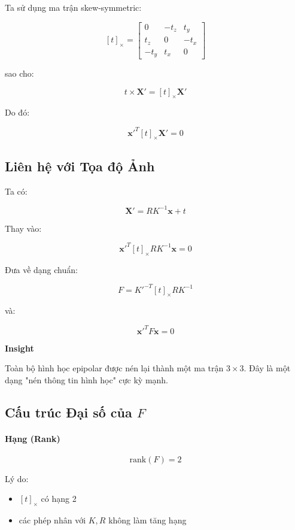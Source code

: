 Ta sử dụng ma trận skew-symmetric:

\[
[t]_\times =
\begin{bmatrix}
	0 & -t_z & t_y \\
	t_z & 0 & -t_x \\
	-t_y & t_x & 0
\end{bmatrix}
\]

sao cho:

\[
t \times \mathbf{X}' = [t]_\times \mathbf{X}'
\]

Do đó:

\[
\mathbf{x}'^T [t]_\times \mathbf{X}' = 0
\]

\subsection{Liên hệ với Tọa độ Ảnh}
\label{subsec:image_relation}

Ta có:

\[
\mathbf{X}' = R K^{-1} \mathbf{x} + t
\]

Thay vào:

\[
\mathbf{x}'^T [t]_\times R K^{-1} \mathbf{x} = 0
\]

Đưa về dạng chuẩn:

\[
F = K'^{-T} [t]_\times R K^{-1}
\]

và:

\[
\mathbf{x}'^T F \mathbf{x} = 0
\]

\begin{mdframed}[style=infobox]
	\textbf{Insight}
	
	Toàn bộ hình học epipolar được nén lại thành một ma trận $3\times3$. Đây là một dạng "nén thông tin hình học" cực kỳ mạnh.
\end{mdframed}

\subsection{Cấu trúc Đại số của $F$}
\label{subsec:F_structure}

\paragraph{Hạng (Rank)}

\[
\text{rank}(F) = 2
\]

Lý do:
\begin{itemize}
	\item $[t]_\times$ có hạng 2
	\item các phép nhân với $K, R$ không làm tăng hạng
\end{itemize}

